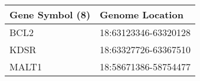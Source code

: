 \begin{tabular}{ll}
\toprule
Gene Symbol (8) &      Genome Location \\
\midrule
           BCL2 & 18:63123346-63320128 \\
           KDSR & 18:63327726-63367510 \\
          MALT1 & 18:58671386-58754477 \\
\bottomrule
\end{tabular}
